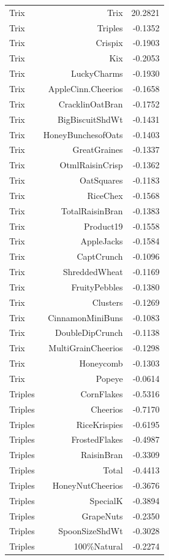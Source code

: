 \begin{longtable}{@{}lrr@{}}
Trix & Trix & 20.2821 \\
Trix & Triples & -0.1352 \\
Trix & Crispix & -0.1903 \\
Trix & Kix & -0.2053 \\
Trix & LuckyCharms & -0.1930 \\
Trix & AppleCinn.Cheerios & -0.1658 \\
Trix & CracklinOatBran & -0.1752 \\
Trix & BigBiscuitShdWt & -0.1431 \\
Trix & HoneyBunchesofOats & -0.1403 \\
Trix & GreatGraines & -0.1337 \\
Trix & OtmlRaisinCrisp & -0.1362 \\
Trix & OatSquares & -0.1183 \\
Trix & RiceChex & -0.1568 \\
Trix & TotalRaisinBran & -0.1383 \\
Trix & Product19 & -0.1558 \\
Trix & AppleJacks & -0.1584 \\
Trix & CaptCrunch & -0.1096 \\
Trix & ShreddedWheat & -0.1169 \\
Trix & FruityPebbles & -0.1380 \\
Trix & Clusters & -0.1269 \\
Trix & CinnamonMiniBuns & -0.1083 \\
Trix & DoubleDipCrunch & -0.1138 \\
Trix & MultiGrainCheerios & -0.1298 \\
Trix & Honeycomb & -0.1303 \\
Trix & Popeye & -0.0614 \\
Triples & CornFlakes & -0.5316 \\
Triples & Cheerios & -0.7170 \\
Triples & RiceKrispies & -0.6195 \\
Triples & FrostedFlakes & -0.4987 \\
Triples & RaisinBran & -0.3309 \\
Triples & Total & -0.4413 \\
Triples & HoneyNutCheerios & -0.3676 \\
Triples & SpecialK & -0.3894 \\
Triples & GrapeNuts & -0.2350 \\
Triples & SpoonSizeShdWt & -0.3028 \\
Triples & 100\%Natural & -0.2274 \\

\end{longtable}
